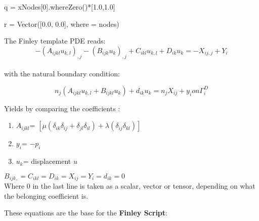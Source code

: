 \begin{python}
q = xNodes{[}0{]}.whereZero(){*}{[}1.0,1.0{]}

r = Vector({[}0.0, 0.0{]}, where = nodes)
\end{python}
The Finley template PDE reads:\\


\[
-(A_{ijkl}u_{k,l})_{,j}-(B_{ijk}u_{k})_{,j}+C_{ikl}u_{k,l}+D_{ik}u_{k}=-X_{ij,j}+Y_{i}\]
\\
with the natural boundary condition:

\[
n_{j}(A_{ijkl}u_{k,l}+B_{ijkl}u_{k})+d_{ik}u_{k}=n_{j}X_{ij}+y_{i}on\Gamma_{i}^{D}\]


Yields by comparing the coefficients :

\begin{enumerate}
\item $A_{ijkl}$= $\left[\mu\left(\delta_{ik}\delta_{ij}+\delta_{jl}\delta_{il}\right)+\lambda\left(\delta_{ij}\delta_{kl}\right)\right]$
\item $y_{i}$= $-p_{i}$
\item $u_{k}$= displacement $u$
\end{enumerate}
$B_{ijk,}=C_{ikl}=D_{ik}=X_{ij}=Y_{i}=d_{ik}=0$\\


Where 0 in the last line is taken as a scalar, vector or tensor, depending
on what the belonging coefficient is.

These equations are the base for the \textbf{Finley Script}:

